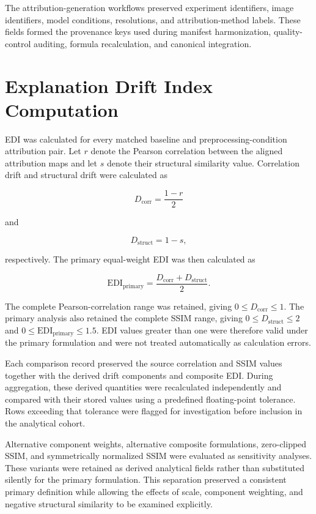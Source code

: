 The attribution-generation workflows preserved experiment identifiers, image identifiers, model conditions, resolutions, and attribution-method labels. These fields formed the provenance keys used during manifest harmonization, quality-control auditing, formula recalculation, and canonical integration.


\section{Explanation Drift Index Computation}

EDI was calculated for every matched baseline and preprocessing-condition attribution pair. Let \(r\) denote the Pearson correlation between the aligned attribution maps and let \(s\) denote their structural similarity value. Correlation drift and structural drift were calculated as

\begin{equation}
D_{\mathrm{corr}}=\frac{1-r}{2}
\end{equation}

and

\begin{equation}
D_{\mathrm{struct}}=1-s,
\end{equation}

respectively. The primary equal-weight EDI was then calculated as

\begin{equation}
\mathrm{EDI}_{\mathrm{primary}}
=
\frac{
D_{\mathrm{corr}}
+
D_{\mathrm{struct}}
}{2}.
\end{equation}

The complete Pearson-correlation range was retained, giving \(0\leq D_{\mathrm{corr}}\leq1\). The primary analysis also retained the complete SSIM range, giving \(0\leq D_{\mathrm{struct}}\leq2\) and \(0\leq\mathrm{EDI}_{\mathrm{primary}}\leq1.5\). EDI values greater than one were therefore valid under the primary formulation and were not treated automatically as calculation errors.

Each comparison record preserved the source correlation and SSIM values together with the derived drift components and composite EDI. During aggregation, these derived quantities were recalculated independently and compared with their stored values using a predefined floating-point tolerance. Rows exceeding that tolerance were flagged for investigation before inclusion in the analytical cohort.

Alternative component weights, alternative composite formulations, zero-clipped SSIM, and symmetrically normalized SSIM were evaluated as sensitivity analyses. These variants were retained as derived analytical fields rather than substituted silently for the primary formulation. This separation preserved a consistent primary definition while allowing the effects of scale, component weighting, and negative structural similarity to be examined explicitly.

